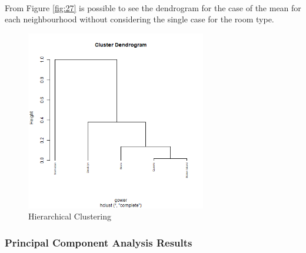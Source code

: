 \documentclass{FR16}
\begin{document}
\\
\noindent From Figure \ref{fig:27} is possible to see the dendrogram  for the case of the mean for each neighbourhood without considering the single case for the room type. 



\begin{figure}[h]
  \centering
    \includegraphics[width=0.7\textwidth]{figures/hc3.PNG} 
 \caption{\label{fig:28} Hierarchical Clustering}
\end{figure}

\newpage
\noindent \subsubsection{Principal Component Analysis Results}
\end{document}
